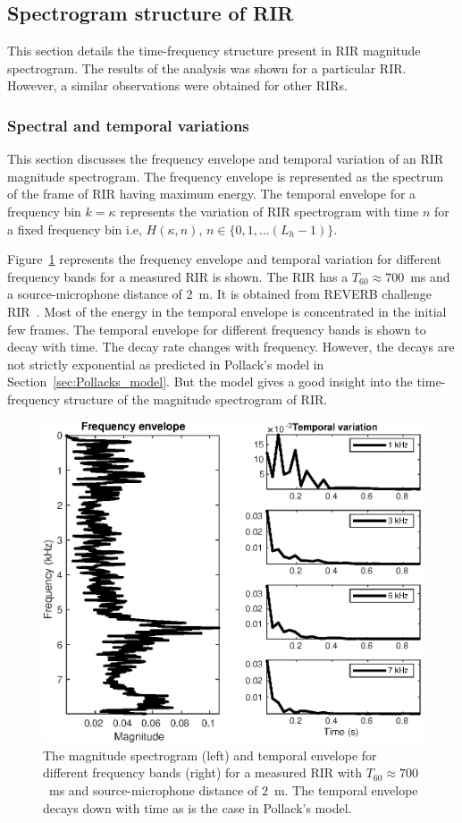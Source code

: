 \subsection{Spectrogram structure of RIR}
This section details the time-frequency structure present in RIR magnitude spectrogram. The results of the analysis was shown for a particular RIR. However, a similar observations were obtained for other RIRs. 

\subsubsection{Spectral and temporal variations}
This section discusses the frequency envelope and temporal variation of an RIR magnitude spectrogram. The frequency envelope is represented as the spectrum of the frame of RIR having maximum energy. The temporal envelope for a frequency bin $k=\kappa$ represents the variation of RIR spectrogram with time $n$ for a fixed frequency bin i.e, $H(\kappa, n)\text{, }n\in\{0,1,...(L_h-1)\}$.

Figure~\ref{fig:RIR_spectrogram} represents the frequency envelope and temporal variation for different frequency bands for a measured RIR is shown. The RIR has a $T_{60}\approx 700$~ms and a source-microphone distance of $2$~m. It is obtained from REVERB challenge RIR~\cite{kinoshita2016summary}.  Most of the energy in the temporal envelope is concentrated in the initial few frames. The temporal envelope for different frequency bands is shown to decay with time. The decay rate changes with frequency. However, the decays are not strictly exponential as predicted in Pollack's model in Section~\ref{sec:Pollacks_model}. But the model gives a good insight into the time-frequency structure of the magnitude spectrogram of RIR.
\begin{figure}
\centering
\includegraphics[width = \linewidth]{fig/RIR_Rank1_Original.eps}
\caption{The magnitude spectrogram (left) and temporal envelope for different frequency bands (right) for a measured RIR with $T_{60}\approx700$~ms and source-microphone distance of $2$~m. The temporal envelope decays down with time as is the case in Pollack's model. }
\label{fig:RIR_spectrogram}
\end{figure}

